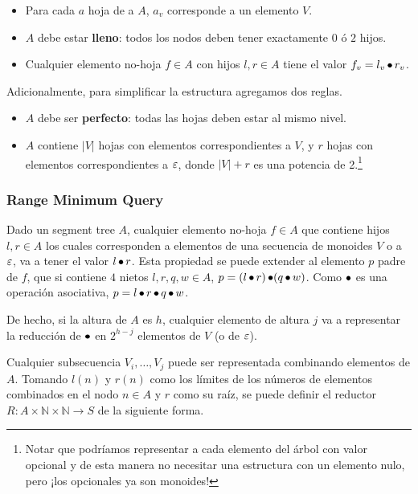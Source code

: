 \begin{itemize}
	\item Para cada \(a\) hoja de a \(A\), \(a_v\) corresponde a un elemento \(V\).
	\item \(A\) debe estar \textbf{lleno}: todos los nodos deben tener exactamente \(0\) ó \(2\) hijos.
	\item Cualquier elemento no-hoja \(f \in A\) con hijos \(l, r \in A\) tiene el valor \(f_v = l_v \operatorname{\bullet} r_v\).
\end{itemize}

Adicionalmente, para simplificar la estructura agregamos dos reglas.

\begin{itemize}
	\item \(A\) debe ser \textbf{perfecto}: todas las hojas deben estar al mismo nivel.
	\item \(A\) contiene \(\left|V\right|\) hojas con elementos correspondientes a \(V\), y \(r\) hojas con elementos correspondientes a \(\mathbf{\varepsilon}\), donde \(|V| + r\) es una potencia de 2.\footnote{Notar que podríamos representar a cada elemento del árbol con valor opcional y de esta manera no necesitar una estructura con un elemento nulo, pero ¡los opcionales ya son monoides!}
\end{itemize}

\subsubsection{Range Minimum Query}

Dado un segment tree \(A\), cualquier elemento no-hoja \(f \in A\) que contiene hijos \(l, r \in A\) los cuales corresponden a elementos de una secuencia de monoides \(V\) o a \(\mathbf{\varepsilon}\), va a tener el valor \(l \operatorname{\bullet} r\). Esta propiedad se puede extender al elemento \(p\) padre de \(f\), que si contiene \(4\) nietos \(l, r, q, w \in A\), \(p = (l \operatorname{\bullet} r) \operatorname{\bullet} (q \operatorname{\bullet} w)\). Como \(\operatorname{\bullet}\) es una operación asociativa, \(p = l \operatorname{\bullet} r \operatorname{\bullet} q \operatorname{\bullet} w\).

De hecho, si la altura de \(A\) es \(h\), cualquier elemento de altura \(j\) va a representar la reducción de \(\operatorname{\bullet}\) en \(2^{h - j}\) elementos de \(V\) (o de \(\mathbf{\varepsilon}\)).

Cualquier subsecuencia \(V_i, \dots, V_j\) puede ser representada combinando elementos de \(A\). Tomando \(l(n)\) y \(r(n)\) como los límites de los números de elementos combinados en el nodo \(n \in A\) y \(r\) como su raíz, se puede definir el reductor \(R : A \times \mathbb{N} \times \mathbb{N} \rightarrow S\) de la siguiente forma.

